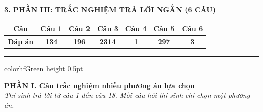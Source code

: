 \documentclass[11pt,a4paper]{article}
\begin{document}
\vspace{2pt}
\noindent
\textbf{\color{mainGreen}3. PHẦN III: TRẮC NGHIỆM TRẢ LỜI NGẮN (6 CÂU)}
\begin{center}
\renewcommand{\arraystretch}{1.2}
\begin{tabular}{|c|c|c|c|c|c|c|}
\hline
\rowcolor{tableGreen}
\textbf{Câu} & \textbf{Câu 1} & \textbf{Câu 2} & \textbf{Câu 3} & \textbf{Câu 4} & \textbf{Câu 5} & \textbf{Câu 6} \\
\hline
\textbf{Đáp án} & \textbf{\color{hfRed}134} & \textbf{\color{hfRed}196} & \textbf{\color{hfRed}2314} & \textbf{\color{hfRed}1} & \textbf{\color{hfRed}297} & \textbf{\color{hfRed}3} \\
\hline
\end{tabular}
\end{center}

\vspace{4pt}
\hrule color{hfGreen} height 0.5pt

\vspace{4pt}
\noindent
{\color{mainGreen}\textbf{\large PHẦN I. Câu trắc nghiệm nhiều phương án lựa chọn}}\\
\textit{\small Thí sinh trả lời từ câu 1 đến câu 18. Mỗi câu hỏi thí sinh chỉ chọn một phương án.}
\vspace{2pt}
\end{document}
